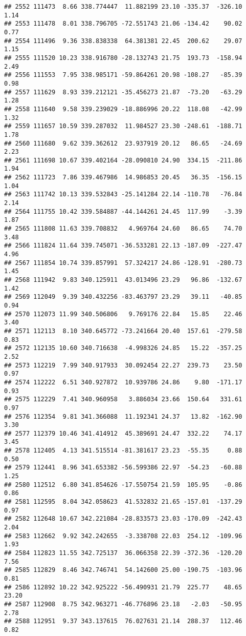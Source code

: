 \documentclass[]{article}
\begin{document}
\begin{verbatim}
## 2552 111473  8.66 338.774447  11.882199 23.10 -335.37  -326.10  1.14
## 2553 111478  8.01 338.796705 -72.551743 21.06 -134.42    90.02  0.77
## 2554 111496  9.36 338.838338  64.381381 22.45  200.62    29.07  1.15
## 2555 111520 10.23 338.916780 -28.132743 21.75  193.73  -158.94  2.49
## 2556 111553  7.95 338.985171 -59.864261 20.98 -108.27   -85.39  0.98
## 2557 111629  8.93 339.212121 -35.456273 21.87  -73.20   -63.29  1.28
## 2558 111640  9.58 339.239029 -18.886996 20.22  118.08   -42.99  1.32
## 2559 111657 10.59 339.287032  11.984527 23.30 -248.61  -188.71  1.78
## 2560 111680  9.62 339.362612  23.937919 20.12   86.65   -24.69  2.23
## 2561 111698 10.67 339.402164 -28.090810 24.90  334.15  -211.86  1.94
## 2562 111723  7.86 339.467986  14.986853 20.45   36.35  -156.15  1.04
## 2563 111742 10.13 339.532843 -25.141284 22.14 -110.78   -76.84  2.14
## 2564 111755 10.42 339.584887 -44.144261 24.45  117.99    -3.39  1.87
## 2565 111808 11.63 339.708832   4.969764 24.60   86.65    74.70  3.48
## 2566 111824 11.64 339.745071 -36.533281 22.13 -187.09  -227.47  4.96
## 2567 111854 10.74 339.857991  57.324217 24.86 -128.91  -280.73  1.45
## 2568 111942  9.83 340.125911  43.013496 23.29   96.86  -132.67  1.42
## 2569 112049  9.39 340.432256 -83.463797 23.29   39.11   -40.85  0.94
## 2570 112073 11.99 340.506806   9.769176 22.84   15.85    22.46  3.40
## 2571 112113  8.10 340.645772 -73.241664 20.40  157.61  -279.58  0.83
## 2572 112135 10.60 340.716638  -4.998326 24.85   15.22  -357.25  2.52
## 2573 112219  7.99 340.917933  30.092454 22.27  239.73    23.50  0.97
## 2574 112222  6.51 340.927872  10.939786 24.86    9.80  -171.17  0.93
## 2575 112229  7.41 340.960958   3.886034 23.66  150.64   331.61  0.97
## 2576 112354  9.81 341.366088  11.192341 24.37   13.82  -162.90  3.30
## 2577 112379 10.46 341.414912  45.389691 24.47  332.22    74.17  3.45
## 2578 112405  4.13 341.515514 -81.381617 23.23  -55.35     0.88  0.50
## 2579 112441  8.96 341.653382 -56.599386 22.97  -54.23   -60.88  1.25
## 2580 112512  6.80 341.854626 -17.550754 21.59  105.95    -0.86  0.86
## 2581 112595  8.04 342.058623  41.532832 21.65 -157.01  -137.29  0.97
## 2582 112648 10.67 342.221084 -28.833573 23.03 -170.09  -242.43  2.04
## 2583 112662  9.92 342.242655  -3.338708 22.03  254.12  -109.96  1.93
## 2584 112823 11.55 342.725137  36.066358 22.39 -372.36  -120.20  7.56
## 2585 112829  8.46 342.746741  54.142600 25.00 -190.75  -103.96  0.81
## 2586 112892 10.22 342.925222 -56.490931 21.79  225.77    48.65 23.20
## 2587 112908  8.75 342.963271 -46.776896 23.18   -2.03   -50.95  2.78
## 2588 112951  9.37 343.137615  76.027631 21.14  288.37   112.46  0.82

\end{verbatim}
\end{document}

